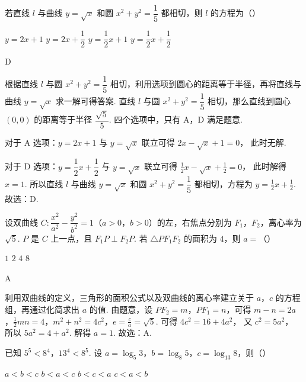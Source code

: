 \begin{problem}
若直线 \(l\) 与曲线 \(y=\sqrt{x}\) 和圆 \(x^2+y^2=\dfrac{1}{5}\) 都相切，则 \(l\) 的方程为（\quad）

\choices
    {\(y=2x+1\)}
    {\(y=2x+\dfrac{1}{2}\)}
    {\(y=\dfrac{1}{2}x+1\)}
    {\(y=\dfrac{1}{2}x+\dfrac{1}{2}\)}
\end{problem}

\begin{answer}
D
\end{answer}

\begin{solution}
根据直线 \(l\) 与圆 \(x^2+y^2=\dfrac{1}{5}\) 相切，利用选项到圆心的距离等于半径，再将直线与曲线 \(y=\sqrt{x}\) 求一解可得答案.
直线 \(l\) 与圆 \(x^2+y^2=\dfrac{1}{5}\) 相切，那么直线到圆心 \((0,0)\) 的距离等于半径 \(\dfrac{\sqrt{5}}{5}\).
四个选项中，只有 A，D 满足题意.

对于 A 选项：\(y=2x+1\) 与 \(y=\sqrt{x}\) 联立可得
\(2x-\sqrt{x}+1=0\)，
此时无解.

对于 D 选项：\(y=\dfrac{1}{2}x+\dfrac{1}{2}\) 与 \(y=\sqrt{x}\) 联立可得
\(\frac{1}{2}x-\sqrt{x}+\frac{1}{2}=0\)，
此时解得 \(x=1\).
所以直线 \(l\) 与曲线 \(y=\sqrt{x}\) 和圆 \(x^2+y^2=\dfrac{1}{5}\) 都相切，方程为
\(y=\frac{1}{2}x+\frac{1}{2}\).
故选：D.
\end{solution}

\begin{problem}
设双曲线 \(C:\dfrac{x^2}{a^2}-\dfrac{y^2}{b^2}=1\)（\(a>0\)，\(b>0\)）的左，右焦点分别为 \(F_1\)，\(F_2\)，离心率为 \(\sqrt{5}\). \(P\) 是 \(C\) 上一点，且 \(F_1P\perp F_2P\). 若 \(\triangle PF_1F_2\) 的面积为 \(4\)，则 \(a=\)（\quad）

\choices
    {\(1\)}
    {\(2\)}
    {\(4\)}
    {\(8\)}
\end{problem}

\begin{answer}
A
\end{answer}

\begin{solution}
利用双曲线的定义，三角形的面积公式以及双曲线的离心率建立关于 \(a\)，\(c\) 的方程组，再通过化简求出 \(a\) 的值.
由题意，设 \(PF_2=m\)，\(PF_1=n\)，可得
\(m-n=2a\)，\(\frac{1}{2}mn=4\)，\(m^2+n^2=4c^2\)，\(e=\frac{c}{a}=\sqrt{5}\).
可得
\(4c^2=16+4a^2\)，
又
\(c^2=5a^2\)，
所以
\(5a^2=4+a^2\).
解得 \(a=1\).
故选：A.
\end{solution}

\begin{problem}
已知 \(5^5<8^4\)，\(13^4<8^5\). 设 \(a=\log_5 3\)，\(b=\log_8 5\)，\(c=\log_{13} 8\)，则（\quad）

\choices
    {\(a<b<c\)}
    {\(b<a<c\)}
    {\(b<c<a\)}
    {\(c<a<b\)}
\end{problem}

